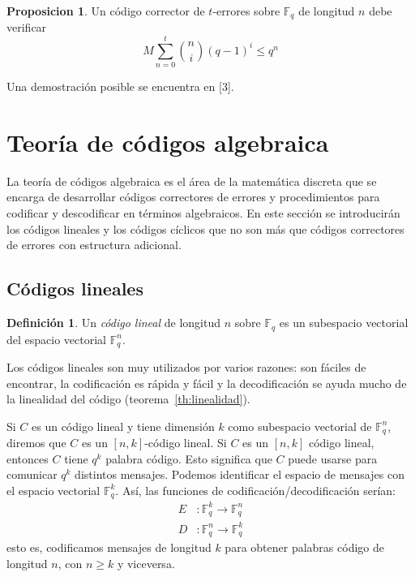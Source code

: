 \documentclass[a4paper,11pt]{article}
\numberwithin{equation}{section}
\theoremstyle{definition} %
\newtheorem{proposicion}{Proposicion}[section]
\newtheorem{definicion}{Definición}[section]
\newcommand{\Fq}{\mathbb{F}_q}
\newcommand{\Fqn}{\mathbb{F}_q^n}
\begin{document}
    \begin{proposicion}
        Un código corrector de $t$-errores sobre $\Fq$ de longitud $n$ debe verificar
        $$
            M \sum_{n=0}^{t}\binom {n}{i}(q - 1)^i \leq q^n
        $$
    \end{proposicion}

    Una demostración posible se encuentra en [3].


    \section{Teoría de códigos algebraica}
    \label{sc:teorica_codigos_algebraica}

    La teoría de códigos algebraica es el área de la matemática discreta que se encarga de desarrollar códigos correctores de errores  y procedimientos para codificar y descodificar en términos algebraicos. En este sección se introducirán los códigos lineales y los códigos cíclicos que no son más que códigos correctores de errores con estructura adicional.

    \subsection{Códigos lineales}

    \begin{definicion}
        Un \emph{código lineal}  de longitud $n$ sobre $\Fq$ es un subespacio vectorial del espacio vectorial $\Fqn$.
    \end{definicion}

    Los códigos lineales son muy utilizados por varios razones: son fáciles de encontrar, la codificación es rápida y fácil y la decodificación se ayuda mucho de la linealidad del código (teorema~\ref{th:linealidad}).

    Si $C$ es un código lineal y tiene dimensión $k$ como subespacio vectorial de $\Fqn$, diremos que $C$ es un $[n, k]$-código lineal. Si $C$ es un $[n, k]$ código lineal, entonces $C$ tiene $q^k$ palabra código. Esto significa que $C$ puede usarse para comunicar $q^k$ distintos mensajes. Podemos identificar el espacio de mensajes con el espacio vectorial $\mathbb{F}_q^k$. Así, las funciones de codificación/decodificación serían:
    \begin{align*}
        E&: \mathbb{F}_q^k \to \mathbb{F}_q^n\\
        D&: \mathbb{F}_q^n \to \mathbb{F}_q^k
    \end{align*}
    esto es, codificamos mensajes de longitud $k$ para obtener palabras código de longitud $n$, con $n \geq k$ y viceversa.
\end{document}
